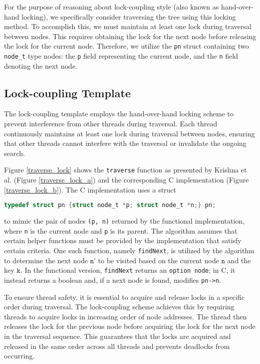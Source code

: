 \documentclass[a4paper,UKenglish,cleveref, autoref, thm-restate]{lipics-v2021}
\begin{document}
For the purpose of reasoning about lock-coupling style (also known as hand-over-hand locking), we specifically consider traversing the tree using this locking method. To accomplish this, we must maintain at least one lock during traversal between nodes. This requires obtaining the lock for the next node before releasing the lock for the current node. Therefore, we utilize the \lstinline{pn} struct containing two \lstinline{node_t} type nodes: the \lstinline{p} field representing the current node, and the \lstinline{n} field denoting the next node.

\subsection{Lock-coupling Template}
The lock-coupling template employs the hand-over-hand locking scheme to prevent interference from other threads during traversal. Each thread continuously maintains at least one lock during traversal between nodes, ensuring that other threads cannot interfere with the traversal or invalidate the ongoing search.

Figure \ref{traverse_lock} shows the \lstinline{traverse} function as presented by Krishna et al. (Figure \ref{traverse_lock_a}) and the corresponding C implementation (Figure \ref{traverse_lock_b}). The C implementation uses a struct
\begin{lstlisting}[language = C, backgroundcolor=\color{white}, basicstyle=\ttfamily\footnotesize]
typedef struct pn {struct node_t *p; struct node_t *n;} pn;
\end{lstlisting}
to mimic the pair of nodes \lstinline{(p, n)} returned by the functional implementation, where \lstinline{n} is the current node and \lstinline{p} is its parent. The algorithm assumes that certain helper functions must be provided by the implementation that satisfy certain criteria. One such function, namely \lstinline{findNext}, is utilized by the algorithm to determine the next node $\texttt{n'}$ to be visited based on the current node $\texttt{n}$ and the key $\texttt{k}$. In the functional version, \lstinline{findNext} returns an \lstinline{option node}; in C, it instead returns a boolean and, if a next node is found, modifies \lstinline{pn->n}.

To ensure thread safety, it is essential to acquire and release locks in a specific order during traversal. The lock-coupling scheme achieves this by requiring threads to acquire locks in increasing order of node addresses. The thread then releases the lock for the previous node before acquiring the lock for the next node in the traversal sequence. This guarantees that the locks are acquired and released in the same order across all threads and prevents deadlocks from occurring.
\end{document}

